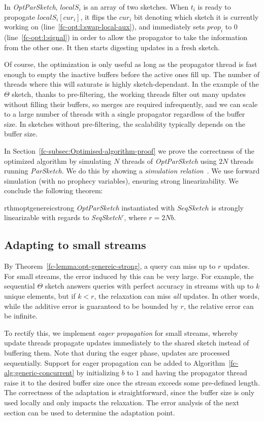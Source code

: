 In \emph{OptParSketch}, $localS_i$ is an array of two sketches. When $t_i$ is ready to propogate $localS_i[cur_i]$, it
flips the $cur_i$ bit denoting which sketch it is currently working on (line~\ref{fc-opt:l:swap-local-aux}), 
and immediately sets $prop_i$ to 0 (line~\ref{fc-opt:l:signal}) in order to allow the propagator to
take the information from the other one. It then starts digesting updates in a fresh sketch.

Of course, the optimization is only useful as long as the propagator thread is fast enough to empty the 
inactive buffers before the active ones fill up. The number of threads where this will saturate is highly sketch-dependant. 
In the example of the $\Theta$ sketch, thanks to pre-filtering, the working threads filter out many updates without filling their buffers, so
merges are required infrequently, and we can scale to a large number of threads with a single propagator regardless of the buffer size. In sketches without pre-filtering, the scalability typically depends on the buffer size.

In Section~\ref{fc-subsec:Optimised-algorithm-proof}
we prove the correctness of the optimized
algorithm by simulating $N$ threads of \emph{OptParSketch}
using $2N$ threads running \emph{ParSketch}. We do this by showing
a \emph{simulation relation}~\cite{lynch1996distributed}. We use forward simulation (with
no prophecy variables), ensuring strong linearizability. We conclude the following theorem:
\begin{restatable}{rthm}{optgenereicstrong}
    \emph{OptParSketch} instantiated with $SeqSketch$ is strongly linearizable with regards to \emph{SeqSketch}$^r$, where
		$r=2Nb$.
    \label{fc-lemma:opt-genereic-strong}
\end{restatable}


\subsection{Adapting to small streams}
\label{fc-ssec:small-streams}

By Theorem~\ref{fc-lemma:opt-genereic-strong}, a query can miss up to $r$ updates. For small
streams, the error induced by this can be very large.
For example, the sequential $\Theta$ sketch answers queries with perfect accuracy in streams with
up to $k$ unique elements, but if $k<r$, the relaxation can miss \emph{all} updates.
In other words, while the additive error is guaranteed to be bounded by $r$, the relative 
error can be infinite.  

To rectify this, we implement \emph{eager propagation} for small streams, 
whereby update threads propagate updates immediately to the shared sketch 
instead of buffering them. 
Note that during the eager phase, updates are processed sequentially. 
Support for eager propagation can be added to Algorithm~\ref{fc-alg:generic-concurrent} 
by initializing $b$ to $1$ and having the propagator thread raise it to the
desired buffer size once the stream exceeds some pre-defined length. 
The correctness of the adaptation is straightforward, since the buffer size is only used locally and only impacts the relaxation.
The error analysis of the next section can be used to determine the adaptation point.
